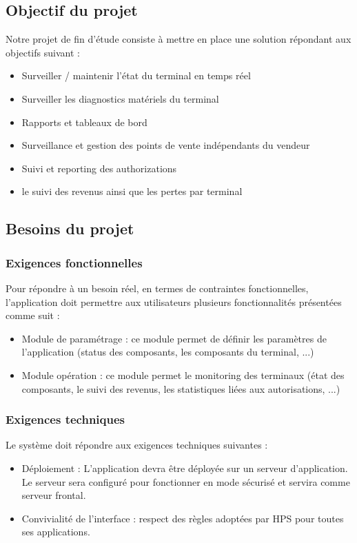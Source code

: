 \subsection{Objectif du projet}
Notre projet de fin d'étude consiste à mettre en place une solution répondant aux objectifs suivant :
\begin{itemize}
\item Surveiller / maintenir l'état du terminal en temps réel
\item Surveiller les diagnostics matériels du terminal
\item Rapports et tableaux de bord
\item Surveillance et gestion des points de vente indépendants du vendeur
\item Suivi et reporting des authorizations
\item le suivi des revenus ainsi que les pertes par terminal
\end{itemize}

\subsection{Besoins du projet}

\subsubsection{Exigences fonctionnelles}

Pour répondre à un besoin réel, en termes de contraintes fonctionnelles, l'application doit permettre aux utilisateurs plusieurs fonctionnalités présentées comme suit :
\begin{itemize}
\item Module de paramétrage : ce module permet de définir les paramètres de l'application (status des composants, les composants du terminal,  ...)
\item Module opération : ce module permet le monitoring des terminaux (état des composants, le suivi des revenus, les statistiques liées aux autorisations, ...) 
\end{itemize}

\subsubsection{Exigences techniques}

Le système doit répondre aux exigences techniques suivantes :
\begin{itemize}
\item Déploiement : L’application devra être déployée sur un serveur d'application.  Le serveur sera configuré pour fonctionner en mode sécurisé et servira comme serveur frontal.
\item Convivialité de l’interface : respect des règles adoptées par HPS pour toutes ses applications.
\end{itemize}

